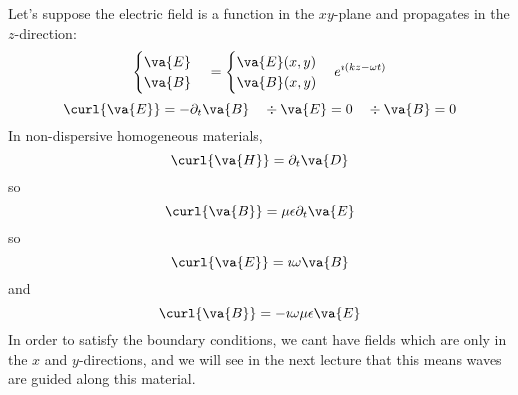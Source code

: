 \documentclass[a4paper,twoside,master.tex]{subfiles}
\begin{document}
Let's suppose the electric field is a function in the $ xy $-plane and propagates in the $ z $-direction:
\begin{equation}
    \begin{cases}\va{E}\\\va{B}\end{cases} = \begin{cases}\va{E}(x,y)\\\va{B}(x,y)\end{cases} e^{\imath (kz- \omega t)}
\end{equation}
\begin{equation}
    \curl{ \va{E}} = - \partial_t \va{B} \quad \div{ \va{E}} = 0 \quad \div{ \va{B}} = 0
\end{equation}
In non-dispersive homogeneous materials,
\begin{equation}
    \curl{ \va{H}} = \partial_t \va{D}
\end{equation}
so
\begin{equation}
    \curl{ \va{B}} = \mu \epsilon \partial_t \va{E}
\end{equation}
so
\begin{equation}
    \curl{ \va{E}} = \imath \omega \va{B}
\end{equation}
and
\begin{equation}
    \curl{ \va{B}} = -\imath \omega \mu \epsilon \va{E}
\end{equation}
In order to satisfy the boundary conditions, we cant have fields which are only in the $ x $ and $ y $-directions, and we will see in the next lecture that this means waves are guided along this material.
\end{document}
